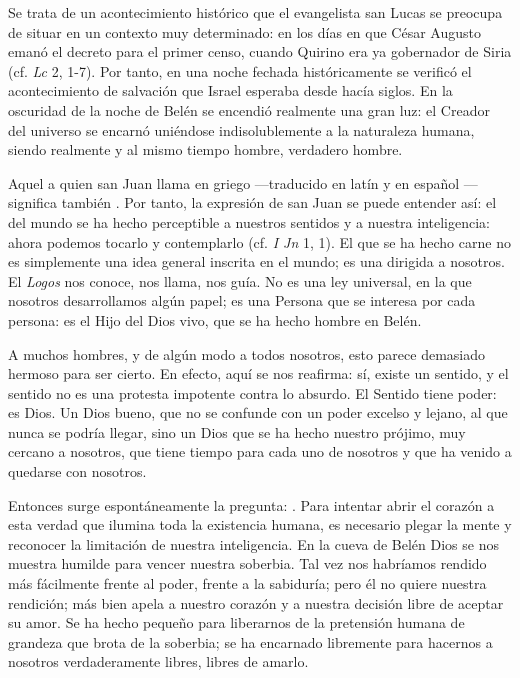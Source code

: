 Se trata de un acontecimiento histórico que el evangelista san Lucas se preocupa de situar en un contexto muy determinado: en los días en que César Augusto emanó el decreto para el primer censo, cuando Quirino era ya gobernador de Siria (cf. \emph{Lc} 2, 1-7). Por tanto, en una noche fechada históricamente se verificó el acontecimiento de salvación que Israel esperaba desde hacía siglos. En la oscuridad de la noche de Belén se encendió realmente una gran luz: el Creador del universo se encarnó uniéndose indisolublemente a la naturaleza humana, siendo realmente  y al mismo tiempo hombre, verdadero hombre.

Aquel a quien san Juan llama en griego  ---traducido en latín  y en español  --- significa también . Por tanto, la expresión de san Juan se puede entender así: el  del mundo se ha hecho perceptible a nuestros sentidos y a nuestra inteligencia: ahora podemos tocarlo y contemplarlo (cf. \emph{I Jn} 1, 1). El  que se ha hecho carne no es simplemente una idea general inscrita en el mundo; es una  dirigida a nosotros. El \emph{Logos} nos conoce, nos llama, nos guía. No es una ley universal, en la que nosotros desarrollamos algún papel; es una Persona que se interesa por cada persona: es el Hijo del Dios vivo, que se ha hecho hombre en Belén.

A muchos hombres, y de algún modo a todos nosotros, esto parece demasiado hermoso para ser cierto. En efecto, aquí se nos reafirma: sí, existe un sentido, y el sentido no es una protesta impotente contra lo absurdo. El Sentido tiene poder: es Dios. Un Dios bueno, que no se confunde con un poder excelso y lejano, al que nunca se podría llegar, sino un Dios que se ha hecho nuestro prójimo, muy cercano a nosotros, que tiene tiempo para cada uno de nosotros y que ha venido a quedarse con nosotros.

Entonces surge espontáneamente la pregunta: . Para intentar abrir el corazón a esta verdad que ilumina toda la existencia humana, es necesario plegar la mente y reconocer la limitación de nuestra inteligencia. En la cueva de Belén Dios se nos muestra  humilde para vencer nuestra soberbia. Tal vez nos habríamos rendido más fácilmente frente al poder, frente a la sabiduría; pero él no quiere nuestra rendición; más bien apela a nuestro corazón y a nuestra decisión libre de aceptar su amor. Se ha hecho pequeño para liberarnos de la pretensión humana de grandeza que brota de la soberbia; se ha encarnado libremente para hacernos a nosotros verdaderamente libres, libres de amarlo.

